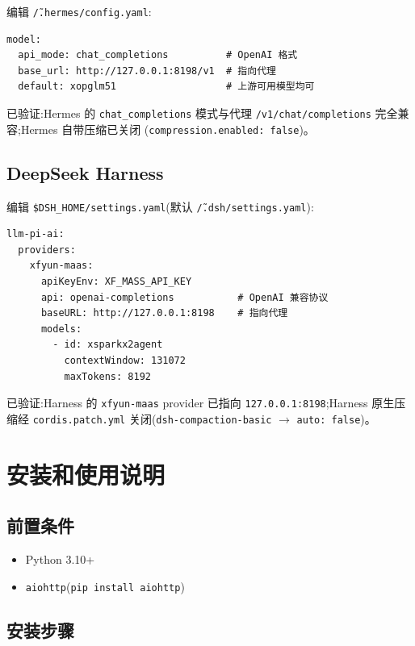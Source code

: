 \documentclass[11pt,a4paper]{article}
\begin{document}
编辑 \texttt{\~/.hermes/config.yaml}:

\begin{lstlisting}[language={}]
model:
  api_mode: chat_completions          # OpenAI 格式
  base_url: http://127.0.0.1:8198/v1  # 指向代理
  default: xopglm51                   # 上游可用模型均可
\end{lstlisting}

已验证:Hermes 的 \texttt{chat\_completions} 模式与代理
\texttt{/v1/chat/completions} 完全兼容;Hermes 自带压缩已关闭
(\texttt{compression.enabled: false})。

\subsection{DeepSeek Harness}

编辑 \texttt{\$DSH\_HOME/settings.yaml}(默认 \texttt{\~/.dsh/settings.yaml}):

\begin{lstlisting}[language={}]
llm-pi-ai:
  providers:
    xfyun-maas:
      apiKeyEnv: XF_MASS_API_KEY
      api: openai-completions           # OpenAI 兼容协议
      baseURL: http://127.0.0.1:8198    # 指向代理
      models:
        - id: xsparkx2agent
          contextWindow: 131072
          maxTokens: 8192
\end{lstlisting}

已验证:Harness 的 \texttt{xfyun-maas} provider 已指向
\texttt{127.0.0.1:8198};Harness 原生压缩经 \texttt{cordis.patch.yml}
关闭(\texttt{dsh-compaction-basic} $\rightarrow$ \texttt{auto: false})。

\section{安装和使用说明}

\subsection{前置条件}

\begin{itemize}
  \item Python 3.10+
  \item \texttt{aiohttp}(\texttt{pip install aiohttp})
\end{itemize}

\subsection{安装步骤}
\end{document}
